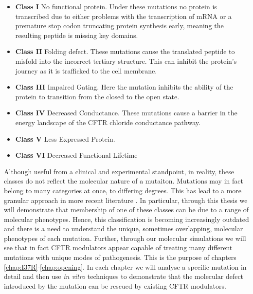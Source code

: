 \begin{itemize}

	\item \textbf{Class I} No functional protein. Under these mutations no protein is transcribed due to either problems with the transcription of mRNA or a premature stop codon truncating protein synthesis early, meaning the resulting peptide is missing key domains. 
	\item \textbf{Class II} Folding defect. These mutations cause the translated peptide to misfold into the incorrect tertiary structure. This can inhibit the protein's journey as it is trafficked to the cell membrane. 
	\item \textbf{Class III} Impaired Gating. Here the mutation inhibits the ability of the protein to transition from the closed to the open state. 
	\item \textbf{Class IV} Decreased Conductance. These mutations cause a barrier in the energy landscape of the CFTR chloride conductance pathway.
	\item \textbf{Class V} Less Expressed Protein.  
	\item \textbf{Class VI} Decreased Functional Lifetime

\end{itemize}

Although useful from a clinical and experimental standpoint, in reality, these classes do not reflect the molecular nature of a mutaiton. Mutations may in fact belong to many categories at once, to differing degrees. This has lead to a more granular approach in more recent literature \cite{veit2016}. In particular, through this thesis we will demonstrate that membership of one of these classes can be due to a range of molecular phenotypes. Hence, this classification is becoming increasingly outdated and there is a need to understand the unique, sometimes overlapping, molecular phenotypes of each mutation. Further, through our molecular simulations we will see that in fact CFTR modulators appear capable of treating many different mutations with unique modes of pathogenesis. This is the purpose of chapters \ref{chap:I37R}-\ref{chap:opening}. In each chapter we will analyse a specific mutation in detail and then use \textit {in vitro} techniques to demonstrate that the molecular defect introduced by the mutation can be rescued by existing CFTR modulators. 

